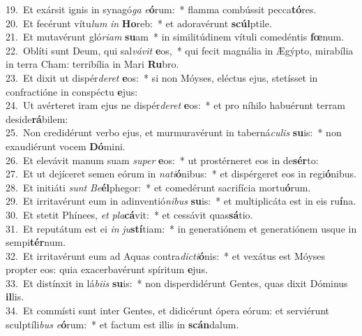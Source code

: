 {19.~}Et exársit ignis in synagó\textit{ga} \textit{e}\textbf{ó}rum:~* flamma combússit pecca\textbf{tó}res.\\
{20.~}Et fecérunt vítu\textit{lum} \textit{in} \textbf{Ho}reb:~* et adoravérunt \textbf{scúl}ptile.\\
{21.~}Et mutavérunt gló\textit{ri}\textit{am} \textbf{su}am~* in similitúdinem vítuli comedéntis \textbf{fœ}num.\\
{22.~}Oblíti sunt Deum, qui sal\textit{vá}\textit{vit} \textbf{e}os,~* qui fecit magnália in Ægýpto, mirabília in terra Cham: terribília in Mari \textbf{Ru}bro.\\
{23.~}Et dixit ut dispér\textit{de}\textit{ret} \textbf{e}os:~* si non Móyses, eléctus ejus, stetísset in confractióne in conspéctu \textbf{e}jus:\\
{24.~}Ut avérteret iram ejus ne dispér\textit{de}\textit{ret} \textbf{e}os:~* et pro níhilo habuérunt terram deside\textbf{rá}bilem:\\
{25.~}Non credidérunt verbo ejus, et murmuravérunt in taberná\textit{cu}\textit{lis} \textbf{su}is:~* non exaudiérunt vocem \textbf{Dó}mini.\\
{26.~}Et elevávit manum suam \textit{su}\textit{per} \textbf{e}os:~* ut prostérneret eos in de\textbf{sér}to:\\
{27.~}Et ut dejíceret semen eórum in \textit{na}\textit{ti}\textbf{ó}nibus:~* et dispérgeret eos in regi\textbf{ó}nibus.\\
{28.~}Et initiáti \textit{sunt} \textit{Be}\textbf{él}phegor:~* et comedérunt sacrifícia mortu\textbf{ó}rum.\\
{29.~}Et irritavérunt eum in adinventió\textit{ni}\textit{bus} \textbf{su}is:~* et multiplicáta est in eis ru\textbf{í}na.\\
{30.~}Et stetit Phínees, \textit{et} \textit{pla}\textbf{cá}vit:~* et cessávit quas\textbf{sá}tio.\\
{31.~}Et reputátum est ei \textit{in} \textit{ju}\textbf{stí}tiam:~* in generatiónem et generatiónem usque in sempi\textbf{tér}num.\\
{32.~}Et irritavérunt eum ad Aquas contra\textit{di}\textit{cti}\textbf{ó}nis:~* et vexátus est Móyses propter eos: quia exacerbavérunt spíritum \textbf{e}jus.\\
{33.~}Et distínxit in lá\textit{bi}\textit{is} \textbf{su}is:~* non disperdidérunt Gentes, quas dixit Dóminus \textbf{il}lis.\\
{34.~}Et commísti sunt inter Gentes, et didicérunt ópera eórum: et serviérunt sculptíli\textit{bus} \textit{e}\textbf{ó}rum:~* et factum est illis in \textbf{scán}dalum.\\
